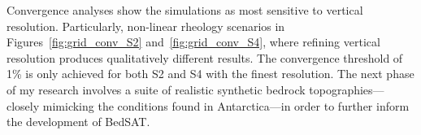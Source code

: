 Convergence analyses show the simulations as most sensitive to vertical resolution. Particularly, non-linear rheology scenarios in Figures~\ref{fig:grid_conv_S2} and~\ref{fig:grid_conv_S4}, where refining vertical resolution produces qualitatively different results. The convergence threshold of 1\% is only achieved for both S2 and S4 with the finest resolution. 
The next phase of my research involves a suite of realistic synthetic bedrock topographies—closely mimicking the conditions found in Antarctica—in order to further inform the development of BedSAT.